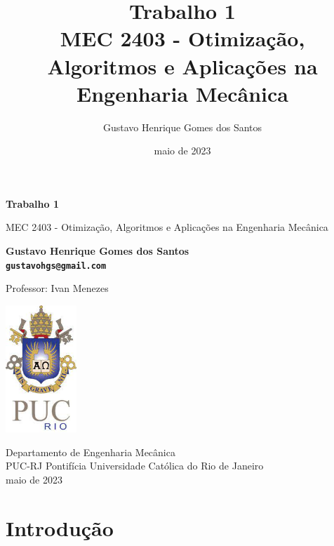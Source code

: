 \documentclass[10pt, a4paper]{article}
\begin{document}
\def\TITLE{Trabalho 1}
\def\DISCIPLINE{MEC 2403 - Otimização, Algoritmos e Aplicações na Engenharia Mecânica}
\def\PROFESSOR{Ivan Menezes}
\def\AUTHOR{Gustavo Henrique Gomes dos Santos}
\def\CONTACT{gustavohgs@gmail.com}
\def\DATE{maio de 2023}

\title{\textbf{\TITLE} \\ \DISCIPLINE}
\author{\AUTHOR}
\date{\DATE}

\begin{titlepage}
      \begin{center}
          \vspace*{1cm}

          \Huge
          \textbf{\TITLE}

          \vspace{0.5cm}
          \LARGE
          \DISCIPLINE

          \vspace{1.5cm}

          \textbf{\AUTHOR \\ {\tt \CONTACT}}

          \vfill
          Professor: \PROFESSOR

          \vspace{0.8cm}

          \includegraphics[width=0.2\textwidth]{../general/puc.jpg}

          \Large
          Departamento de Engenharia Mecânica\\
          PUC-RJ Pontifícia Universidade Católica do Rio de Janeiro\\
          \DATE

      \end{center}
  \end{titlepage}

\maketitle

\section{Introdução}
\end{document}
